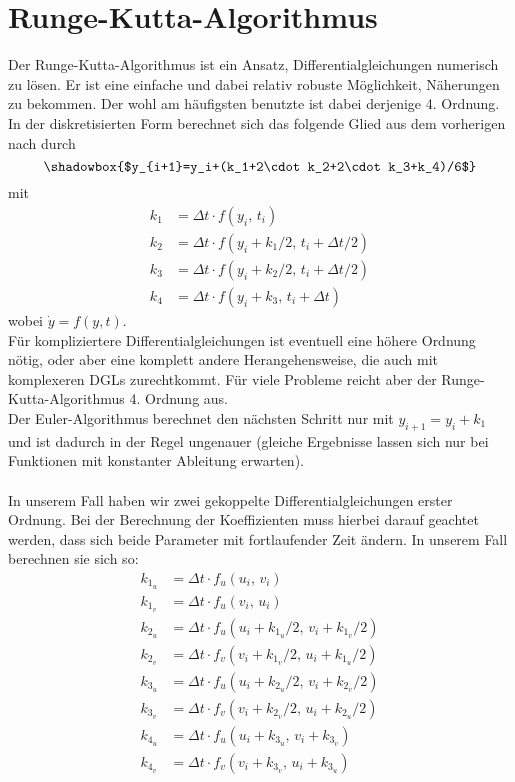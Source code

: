 \documentclass[12pt,a4paper,titlepage,headinclude,bibtotoc]{scrartcl}
\begin{document}
\section{Runge-Kutta-Algorithmus}
Der Runge-Kutta-Algorithmus ist ein Ansatz, Differentialgleichungen numerisch zu lösen.
Er ist eine einfache und dabei relativ robuste Möglichkeit, Näherungen zu bekommen.
Der wohl am häufigsten benutzte ist dabei derjenige 4. Ordnung.
In der diskretisierten Form berechnet sich das folgende Glied aus dem vorherigen nach \cite[S.130]{scientificcomp} durch
$$\shadowbox{$y_{i+1}=y_i+(k_1+2\cdot k_2+2\cdot k_3+k_4)/6$}$$ 
mit
\begin{align*}
k_1&=\Delta t\cdot f(y_i,\, t_i)\\
k_2&=\Delta t\cdot f(y_i+k_1/2,\, t_i+\Delta t/2)\\
k_3&=\Delta t\cdot f(y_i+k_2/2,\, t_i+\Delta t/2)\\
k_4&=\Delta t\cdot f(y_i+k_3,\, t_i+\Delta t)
\end{align*}
wobei $\dot y=f(y,t)$.\\
Für kompliziertere Differentialgleichungen ist eventuell eine höhere Ordnung nötig, oder aber eine komplett andere Herangehensweise, die auch mit komplexeren DGLs zurechtkommt.
Für viele Probleme reicht aber der Runge-Kutta-Algorithmus 4. Ordnung aus.\\
Der Euler-Algorithmus berechnet den nächsten Schritt nur mit $y_{i+1}=y_i+k_1$ und ist dadurch in der Regel ungenauer (gleiche Ergebnisse lassen sich nur bei Funktionen mit konstanter Ableitung erwarten).\\\\
In unserem Fall haben wir zwei gekoppelte Differentialgleichungen erster Ordnung.
Bei der Berechnung der Koeffizienten muss hierbei darauf geachtet werden, dass sich beide Parameter mit fortlaufender Zeit ändern.
In unserem Fall berechnen sie sich so:
\begin{align*}
k_{1_u}&=\Delta t\cdot f_u(u_i,\, v_i)\\
k_{1_v}&=\Delta t\cdot f_u(v_i,\, u_i)\\
k_{2_u}&=\Delta t\cdot f_u(u_i+k_{1_u}/2,\, v_i+k_{1_v}/2)\\
k_{2_v}&=\Delta t\cdot f_v(v_i+k_{1_v}/2,\, u_i+k_{1_u}/2)\\
k_{3_u}&=\Delta t\cdot f_u(u_i+k_{2_u}/2,\, v_i+k_{2_v}/2)\\
k_{3_v}&=\Delta t\cdot f_v(v_i+k_{2_v}/2,\, u_i+k_{2_u}/2)\\
k_{4_u}&=\Delta t\cdot f_u(u_i+k_{3_u},\, v_i+k_{3_v})\\
k_{4_v}&=\Delta t\cdot f_v(v_i+k_{3_v},\, u_i+k_{3_u})
\end{align*}
\end{document}
